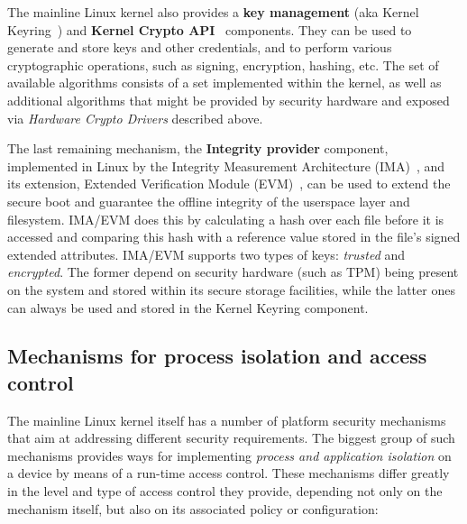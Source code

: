 The mainline Linux kernel also provides a \textbf{key management} (aka Kernel Keyring~\cite{keyrings}) and \textbf{Kernel Crypto API}~\cite{kernelcryptoapi} components. They can be used to generate and store keys and other credentials, and to perform various cryptographic operations, such as signing, encryption, hashing, etc. The set of available algorithms consists of a set implemented within the kernel, as well as additional algorithms that might be provided by security hardware and exposed via \textit{Hardware Crypto Drivers} described above.

The last remaining mechanism, the \textbf{Integrity provider} component, implemented in Linux by the Integrity Measurement Architecture (IMA)~\cite{ima}, and its extension, Extended Verification Module (EVM)~\cite{ima}, can be used to extend the secure boot and guarantee the offline integrity of the userspace layer and filesystem. IMA/EVM does this by calculating a hash over each file before it is accessed and comparing this hash with a reference value stored in the file's signed extended attributes. IMA/EVM supports two types of keys: \textit{trusted} and \textit{encrypted}. The former depend on security hardware (such as TPM) being present on the system and stored within its secure storage facilities, while the latter ones can always be used and stored in the Kernel Keyring component. 

\subsection{Mechanisms for process isolation and access control}

The mainline Linux kernel itself has a number of platform security mechanisms that aim at addressing different security requirements. The biggest group of such mechanisms provides ways for implementing \textit{process and application isolation} on a device by means of a run-time access control. These mechanisms differ greatly in the level and type of access control they provide, depending not only on the mechanism itself, but also on its associated policy or configuration:

